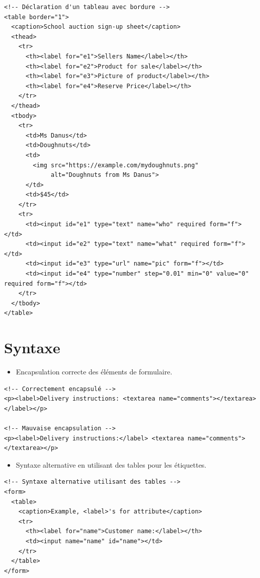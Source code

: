 \documentclass{report}
\begin{document}
\begin{multicols*}{2}
\begin{lstlisting}[style=HTMLDraculaDark]
<!-- Déclaration d'un tableau avec bordure -->
<table border="1">
  <caption>School auction sign-up sheet</caption>
  <thead>
    <tr>
      <th><label for="e1">Sellers Name</label></th>
      <th><label for="e2">Product for sale</label></th>
      <th><label for="e3">Picture of product</label></th>
      <th><label for="e4">Reserve Price</label></th>
    </tr>
  </thead>
  <tbody>
    <tr>
      <td>Ms Danus</td>
      <td>Doughnuts</td>
      <td>
        <img src="https://example.com/mydoughnuts.png"
             alt="Doughnuts from Ms Danus">
      </td>
      <td>$45</td>
    </tr>
    <tr>
      <td><input id="e1" type="text" name="who" required form="f"></td>
      <td><input id="e2" type="text" name="what" required form="f"></td>
      <td><input id="e3" type="url" name="pic" form="f"></td>
      <td><input id="e4" type="number" step="0.01" min="0" value="0" required form="f"></td>
    </tr>
  </tbody>
</table>
\end{lstlisting}
\section{Syntaxe}

\begin{itemize}
    \item Encapsulation correcte des éléments de formulaire.
\end{itemize}

\begin{lstlisting}[style=HTMLDraculaDark]
<!-- Correctement encapsulé -->
<p><label>Delivery instructions: <textarea name="comments"></textarea></label></p>

<!-- Mauvaise encapsulation -->
<p><label>Delivery instructions:</label> <textarea name="comments"></textarea></p>
\end{lstlisting}

\begin{itemize}
    \item Syntaxe alternative en utilisant des tables pour les étiquettes.
\end{itemize}

\begin{lstlisting}[style=HTMLDraculaDark]
<!-- Syntaxe alternative utilisant des tables -->
<form>
  <table>
    <caption>Example, <label>'s for attribute</caption>
    <tr>
      <th><label for="name">Customer name:</label></th>
      <td><input name="name" id="name"></td>
    </tr>
  </table>
</form>
\end{lstlisting}


\end{multicols*}
\end{document}
